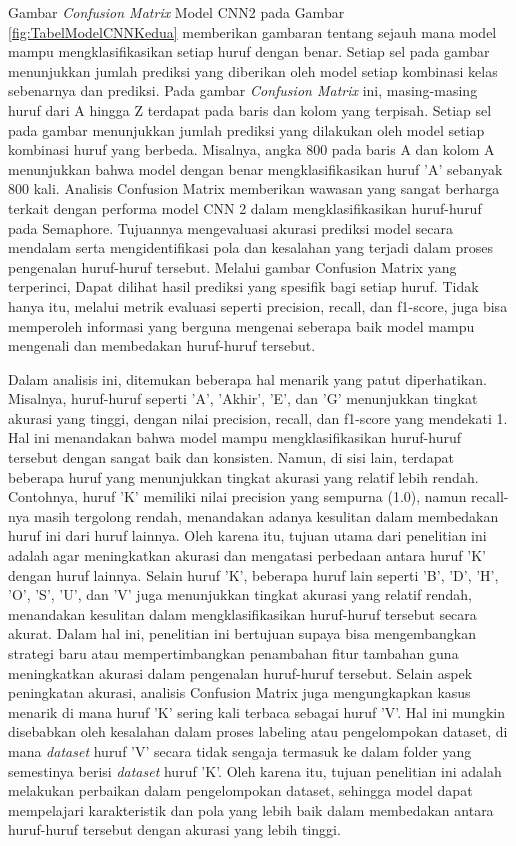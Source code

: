 Gambar \textit{Confusion Matrix} Model CNN2 pada Gambar \ref{fig:TabelModelCNNKedua} memberikan gambaran tentang sejauh mana model mampu mengklasifikasikan setiap huruf dengan benar. Setiap sel pada gambar menunjukkan jumlah prediksi yang diberikan oleh model setiap kombinasi kelas sebenarnya dan prediksi. Pada gambar \textit{Confusion Matrix} ini, masing-masing huruf dari A hingga Z terdapat pada baris dan kolom yang terpisah. Setiap sel pada gambar menunjukkan jumlah prediksi yang dilakukan oleh model setiap kombinasi huruf yang berbeda. Misalnya, angka 800 pada baris A dan kolom A menunjukkan bahwa model dengan benar mengklasifikasikan huruf 'A' sebanyak 800 kali. Analisis Confusion Matrix memberikan wawasan yang sangat berharga terkait dengan performa model CNN 2 dalam mengklasifikasikan huruf-huruf pada Semaphore. Tujuannya mengevaluasi akurasi prediksi model secara mendalam serta mengidentifikasi pola dan kesalahan yang terjadi dalam proses pengenalan huruf-huruf tersebut. Melalui gambar Confusion Matrix yang terperinci, Dapat dilihat hasil prediksi yang spesifik bagi setiap huruf. Tidak hanya itu, melalui metrik evaluasi seperti precision, recall, dan f1-score, juga bisa memperoleh informasi yang berguna mengenai seberapa baik model mampu mengenali dan membedakan huruf-huruf tersebut.

Dalam analisis ini, ditemukan beberapa hal menarik yang patut diperhatikan. Misalnya, huruf-huruf seperti 'A', 'Akhir', 'E', dan 'G' menunjukkan tingkat akurasi yang tinggi, dengan nilai precision, recall, dan f1-score yang mendekati 1. Hal ini menandakan bahwa model mampu mengklasifikasikan huruf-huruf tersebut dengan sangat baik dan konsisten. Namun, di sisi lain, terdapat beberapa huruf yang menunjukkan tingkat akurasi yang relatif lebih rendah. Contohnya, huruf 'K' memiliki nilai precision yang sempurna (1.0), namun recall-nya masih tergolong rendah, menandakan adanya kesulitan dalam membedakan huruf ini dari huruf lainnya. Oleh karena itu, tujuan utama dari penelitian ini adalah agar meningkatkan akurasi dan mengatasi perbedaan antara huruf 'K' dengan huruf lainnya. Selain huruf 'K', beberapa huruf lain seperti 'B', 'D', 'H', 'O', 'S', 'U', dan 'V' juga menunjukkan tingkat akurasi yang relatif rendah, menandakan kesulitan dalam mengklasifikasikan huruf-huruf tersebut secara akurat. Dalam hal ini, penelitian ini bertujuan supaya bisa mengembangkan strategi baru atau mempertimbangkan penambahan fitur tambahan guna meningkatkan akurasi dalam pengenalan huruf-huruf tersebut. Selain aspek peningkatan akurasi, analisis Confusion Matrix juga mengungkapkan kasus menarik di mana huruf 'K' sering kali terbaca sebagai huruf 'V'. Hal ini mungkin disebabkan oleh kesalahan dalam proses labeling atau pengelompokan dataset, di mana \textit{dataset} huruf 'V' secara tidak sengaja termasuk ke dalam folder yang semestinya berisi \textit{dataset} huruf 'K'. Oleh karena itu, tujuan penelitian ini adalah melakukan perbaikan dalam pengelompokan dataset, sehingga model dapat mempelajari karakteristik dan pola yang lebih baik dalam membedakan antara huruf-huruf tersebut dengan akurasi yang lebih tinggi.

